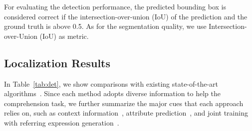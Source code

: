 \documentclass{bmvc2k}
\begin{document}
For evaluating the detection performance, the predicted bounding box is considered correct if the intersection-over-union (IoU) of the prediction and the ground truth is above 0.5. As for the segmentation quality, we use Intersection-over-Union (IoU) as metric.
\subsection{Localization Results}
In Table~\ref{tab:det}, we show comparisons with existing state-of-the-art algorithms~\cite{Liu_ICCV_2017_2,Luo_CVPR_2017,Nagaraja_ECCV_2016,Yu_CVPR_2018,Yu_CVPR_2017,Zhang_CVPR_2018}.
Since each method adopts diverse information to help the comprehension task, we further summarize the major cues that each approach relies on, such as context information~\cite{Nagaraja_ECCV_2016,Zhang_CVPR_2018}, attribute prediction~\cite{Liu_ICCV_2017_2,Yu_CVPR_2018}, and joint training with referring expression generation~\cite{Liu_ICCV_2017_2,Luo_CVPR_2017,Yu_CVPR_2017}.
\end{document}
